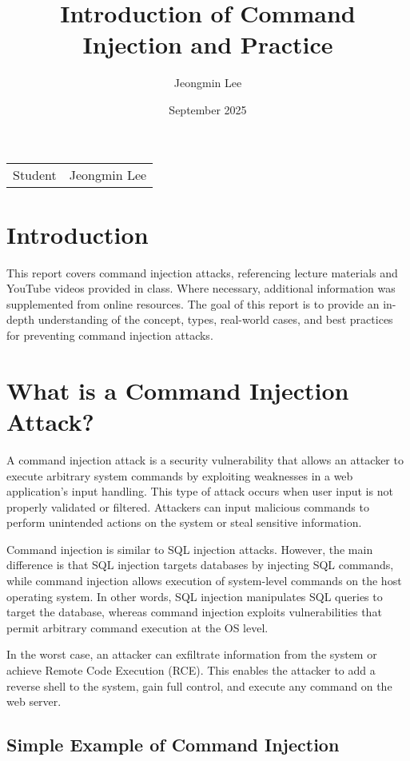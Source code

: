 \documentclass{article}
\title{Introduction of Command Injection and Practice}
\author{Jeongmin Lee}
\date{September 2025}
\begin{document}
\maketitle

\noindent\begin{tabular}{@{}ll}
  Student & Jeongmin Lee\\
\end{tabular}

\section*{Introduction}
This report covers command injection attacks, referencing lecture materials and YouTube videos provided in class. Where necessary, additional information was supplemented from online resources. The goal of this report is to provide an in-depth understanding of the concept, types, real-world cases, and best practices for preventing command injection attacks.

\section*{What is a Command Injection Attack?}
A command injection attack is a security vulnerability that allows an attacker to execute arbitrary system commands by exploiting weaknesses in a web application's input handling.
This type of attack occurs when user input is not properly validated or filtered.
Attackers can input malicious commands to perform unintended actions on the system or steal sensitive information.

Command injection is similar to SQL injection attacks. However, the main difference is that SQL injection targets databases by injecting SQL commands, while command injection allows execution of system-level commands on the host operating system.
In other words, SQL injection manipulates SQL queries to target the database, whereas command injection exploits vulnerabilities that permit arbitrary command execution at the OS level.

In the worst case, an attacker can exfiltrate information from the system or achieve Remote Code Execution (RCE).
This enables the attacker to add a reverse shell to the system, gain full control, and execute any command on the web server.

\subsection*{Simple Example of Command Injection}
\end{document}
